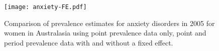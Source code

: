     \begin{figure}[h]
        \begin{center}
            \texttt{[image: anxiety-FE.pdf]}
            \caption{Comparison of prevalence estimates for anxiety
              disorders in 2005 for women in Australasia using point
              prevalence data only, point and period prevalence data
              with and without a fixed effect.}
            \label{fig:app-anxiety FE}
        \end{center}
    \end{figure}

